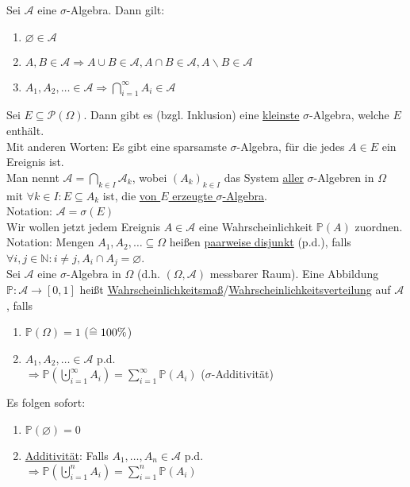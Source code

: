 \documentclass[a4paper]{article}
\renewcommand\hateq{\mathrel{\stackon[1.5pt]{=}{\stretchto{%
				\scalerel*[\widthof{=}]{\wedge}{\rule{1ex}{3ex}}}{0.5ex}}}}
\newcommand{\ul}{\underline}
\begin{document}
Sei $\mathcal{A}$ eine $\sigma$-Algebra. Dann gilt:
\begin{enumerate}[1)]
	\item $\varnothing\in\mathcal{A}$
	\item $A,B\in\mathcal{A}\Rightarrow A\cup B\in\mathcal{A},A\cap B\in\mathcal{A},A\backslash B\in\mathcal{A}$
	\item $A_1,A_2,\dots\in\mathcal{A}\Rightarrow\bigcap_{i=1}^\infty A_i\in\mathcal{A}$
\end{enumerate}
Sei $E\subseteq\mathcal{P}(\Omega)$. Dann gibt es (bzgl. Inklusion) eine \ul{kleinste} $\sigma$-Algebra, welche $E$ enthält.\\
Mit anderen Worten: Es gibt eine sparsamste $\sigma$-Algebra, für die jedes $A\in E$ ein Ereignis ist.\\
Man nennt $\mathcal{A}=\bigcap_{k\in I}\mathcal{A}_k$, wobei $(A_k)_{k\in I}$ das System \ul{aller} $\sigma$-Algebren in $\Omega$ mit $\forall k\in I:E\subseteq A_k$ ist, die \ul{von $E$ erzeugte $\sigma$-Algebra}.\\
Notation: $\mathcal{A}=\sigma(E)$\\
Wir wollen jetzt jedem Ereignis $A\in\mathcal{A}$ eine Wahrscheinlichkeit $\mathbb{P}(A)$ zuordnen.\\
Notation: Mengen $A_1,A_2,\dots\subseteq\Omega$ heißen \ul{paarweise disjunkt} (p.d.), falls $\forall i,j\in\mathbb{N}:i\neq j,A_i\cap A_j=\varnothing$.\\
Sei $\mathcal{A}$ eine $\sigma$-Algebra in $\Omega$ (d.h. $(\Omega,\mathcal{A})$ messbarer Raum). Eine Abbildung $\mathbb{P}:\mathcal{A}\rightarrow\left[0,1\right]$ heißt \ul{Wahrscheinlichkeitsmaß}/\ul{Wahrscheinlichkeitsverteilung} auf $\mathcal{A}$, falls
\begin{enumerate}[1)]
	\item $\mathbb{P}(\Omega)=1$ ($\hateq 100\%$)
	\item $A_1,A_2,\dots\in\mathcal{A}$ p.d.\\
	$\Rightarrow\mathbb{P}(\bigcupdot_{i=1}^\infty A_i)=\sum_{i=1}^\infty\mathbb{P}(A_i)$ ($\sigma$-Additivität)
\end{enumerate}
Es folgen sofort:
\begin{enumerate}[1)]
	\item $\mathbb{P}(\varnothing)=0$
	\item \ul{Additivität}: Falls $A_1,\dots,A_n\in\mathcal{A}$ p.d.\\
	$\Rightarrow\mathbb{P}(\bigcupdot_{i=1}^n A_i)=\sum_{i=1}^n\mathbb{P}(A_i)$
\end{enumerate}
\end{document}
